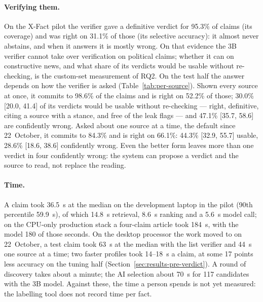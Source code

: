 \paragraph{Verifying them.} On the X-Fact pilot the verifier gave a
definitive verdict for 95.3\% of claims (its coverage) and was right on
31.1\% of those (its selective accuracy): it almost never abstains, and
when it answers it is mostly wrong. On that evidence the 3B verifier
cannot take over verification on political claims; whether it can on
constructive news, and what share of its verdicts would be usable
without re-checking, is the custom-set measurement of RQ2. On the test
half the answer depends on how the verifier is asked
(Table~\ref{tab:per-source}). Shown every source at once, it commits to
98.6\% of the claims and is right on 52.2\% of those; 30.0\% [20.0,
41.4] of its verdicts would be usable without re-checking --- right,
definitive, citing a source with a stance, and free of the leak flags
--- and 47.1\% [35.7, 58.6] are confidently wrong. Asked about one
source at a time, the default since 22~October, it commits to 84.3\%
and is right on 66.1\%: 44.3\% [32.9, 55.7] usable, 28.6\% [18.6, 38.6]
confidently wrong. Even the better form leaves more than one verdict in
four confidently wrong: the system can propose a verdict and the source
to read, not replace the reading.

\paragraph{Time.} A claim took 36.5~s at the median on the development
laptop in the pilot (90th percentile 59.9~s), of which 14.8~s
retrieval, 8.6~s ranking and a 5.6~s model call; on the CPU-only
production stack a four-claim article took 184~s, with the model 180 of
those seconds. On the desktop processor the work moved to on
22~October, a test claim took 63~s at the median with the list verifier
and 44~s one source at a time; two faster profiles took 14--18~s a
claim, at some 17 points less accuracy on the tuning half
(Section~\ref{sec:results-pre-verdict}). A round of discovery takes about a minute; the AI
selection about 70~s for 117 candidates with the 3B model. Against
these, the time a person spends is not yet measured: the labelling
tool does not record time per fact.

